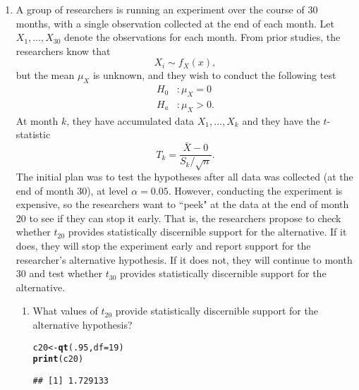 \documentclass{article}\usepackage[]{graphicx}\usepackage[]{xcolor}
\makeatletter
\newcommand{\hlnum}[1]{\textcolor[rgb]{0.686,0.059,0.569}{#1}}%
\newcommand{\hldef}[1]{\textcolor[rgb]{0.345,0.345,0.345}{#1}}%
\newcommand{\hlkwb}[1]{\textcolor[rgb]{0.69,0.353,0.396}{#1}}%
\newcommand{\hlkwc}[1]{\textcolor[rgb]{0.333,0.667,0.333}{#1}}%
\newcommand{\hlkwd}[1]{\textcolor[rgb]{0.737,0.353,0.396}{\textbf{#1}}}%
\newenvironment{kframe}{%
 \def\at@end@of@kframe{}%
 \ifinner\ifhmode%
  \def\at@end@of@kframe{\end{minipage}}%
  \begin{minipage}{\columnwidth}%
 \fi\fi%
 \def\FrameCommand##1{\hskip\@totalleftmargin \hskip-\fboxsep
 \colorbox{shadecolor}{##1}\hskip-\fboxsep
     \hskip-\linewidth \hskip-\@totalleftmargin \hskip\columnwidth}%
 \MakeFramed {\advance\hsize-\width
   \@totalleftmargin\z@ \linewidth\hsize
   \@setminipage}}%
 {\par\unskip\endMakeFramed%
 \at@end@of@kframe}
\newenvironment{knitrout}{}{} %
\makeatother
\begin{document}
\begin{enumerate}
\item A group of researchers is running an experiment over the course of 30 months, 
with a single observation collected at the end of each month. Let $X_1, ..., X_{30}$
denote the observations for each month. From prior studies, the researchers know that
\[X_i \sim f_X(x),\]
but the mean $\mu_X$ is unknown, and they wish to conduct the following test
\begin{align*}
H_0&: \mu_X = 0\\
H_a&: \mu_X > 0.
\end{align*}
At month $k$, they have accumulated data $X_1, ..., X_k$ and they have the 
$t$-statistic
\[T_k = \frac{\bar{X} - 0}{S_k/\sqrt{n}}.\]
The initial plan was to test the hypotheses after all data was collected (at the 
end of month 30), at level $\alpha=0.05$. However, conducting the experiment is 
expensive, so the researchers want to ``peek" at the data at the end of month 20 
to see if they can stop it early. That is, the researchers propose to check 
whether $t_{20}$ provides statistically discernible support for the alternative. 
If it does, they will stop the experiment early and report support for the 
researcher's alternative hypothesis. If it does not, they will continue to month 
30 and test whether $t_{30}$ provides statistically discernible support for the
alternative.

\begin{enumerate}
  \item What values of $t_{20}$ provide statistically discernible support for the
  alternative hypothesis?
\begin{knitrout}\scriptsize
{}\color{fgcolor}\begin{kframe}
\begin{alltt}
\hldef{c20} \hlkwb{<-} \hlkwd{qt}\hldef{(}\hlnum{.95}\hldef{,} \hlkwc{df} \hldef{=} \hlnum{19}\hldef{)}
\hlkwd{print}\hldef{(c20)}
\end{alltt}
\begin{verbatim}
## [1] 1.729133
\end{verbatim}
\end{kframe}
\end{knitrout}


\end{enumerate}
\end{enumerate}
\end{document}
